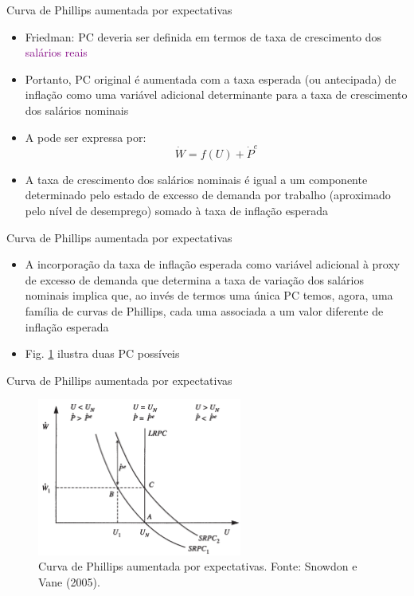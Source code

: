 \documentclass[10pt]{beamer}
\begin{document}
\begin{frame}{Curva de Phillips aumentada por expectativas}
    \begin{itemize}
        \item Friedman: PC deveria ser definida em termos de taxa de crescimento dos \textcolor{purple}{salários reais}
        \bigskip
        \item Portanto, PC original é aumentada com a taxa esperada (ou antecipada) de inflação como uma variável adicional determinante para a taxa de crescimento dos salários nominais
        \bigskip
        \item A  pode ser expressa por:
        \begin{equation}
            \dot{W} = f(U) + \dot{P}^e
            \label{eq1}
        \end{equation}
        \bigskip
        \item A taxa de crescimento dos salários nominais é igual a um componente determinado pelo estado de excesso de demanda por trabalho (aproximado pelo nível de desemprego) somado à taxa de inflação esperada
    \end{itemize}    
\end{frame}

\begin{frame}{Curva de Phillips aumentada por expectativas}
    \begin{itemize}
        \item A incorporação da taxa de inflação esperada como variável adicional à proxy de excesso de demanda que determina a taxa de variação dos salários nominais implica que, ao invés de termos uma única PC temos, agora, uma família de curvas de Phillips, cada uma associada a um valor diferente de inflação esperada
        \bigskip
        \item Fig. \ref{fig11} ilustra duas PC possíveis
    \end{itemize}    
\end{frame}

\begin{frame}{Curva de Phillips aumentada por expectativas}
    \begin{figure}
        \centering
        \includegraphics[width=0.6\textwidth]{./figures/aula10_fig11.PNG}
        \caption{Curva de Phillips aumentada por expectativas. Fonte: Snowdon e Vane (2005).}
        \label{fig11}
    \end{figure}
\end{frame}
\end{document}
